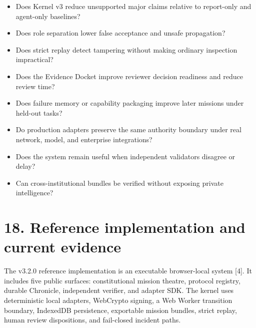 \begin{itemize}
\item
  Does Kernel v3 reduce unsupported major claims relative to report-only
  and agent-only baselines?
\item
  Does role separation lower false acceptance and unsafe propagation?
\item
  Does strict replay detect tampering without making ordinary inspection
  impractical?
\item
  Does the Evidence Docket improve reviewer decision readiness and
  reduce review time?
\item
  Does failure memory or capability packaging improve later missions
  under held-out tasks?
\item
  Do production adapters preserve the same authority boundary under real
  network, model, and enterprise integrations?
\item
  Does the system remain useful when independent validators disagree or
  delay?
\item
  Can cross-institutional bundles be verified without exposing private
  intelligence?
\end{itemize}

\section{18. Reference implementation and current
evidence}\label{reference-implementation-and-current-evidence}

The v3.2.0 reference implementation is an executable browser-local
system {[}4{]}. It includes five public surfaces: constitutional mission
theatre, protocol registry, durable Chronicle, independent verifier, and
adapter SDK. The kernel uses deterministic local adapters, WebCrypto
signing, a Web Worker transition boundary, IndexedDB persistence,
exportable mission bundles, strict replay, human review dispositions,
and fail-closed incident paths.

